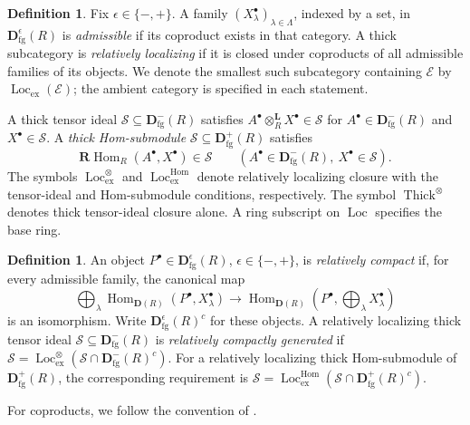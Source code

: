\documentclass[11pt]{amsart}
\numberwithin{equation}{section}
\theoremstyle{definition}
\newtheorem{definition}[theorem]{Definition}
\theoremstyle{remark}
\DeclareMathOperator{\Loc}{Loc}
\DeclareMathOperator{\Thick}{Thick}
\DeclareMathOperator{\Hom}{Hom}
\newcommand{\RHom}{\mathbf R\!\Hom}
\newcommand{\Lotimes}{\otimes_R^{\mathbf L}}
\newcommand{\D}{\mathbf D}
\newcommand{\fg}{\mathrm{fg}}
\newcommand{\Lex}{\Loc_{\mathrm{ex}}}
\newcommand{\Lten}{\Loc_{\mathrm{ex}}^{\otimes}}
\newcommand{\Lhom}{\Loc_{\mathrm{ex}}^{\Hom}}
\begin{document}
\begin{definition}\label{def:closures}
Fix $\epsilon\in\{-,+\}$. A family $(X^{\bullet}_\lambda)_{\lambda\in\Lambda}$,
indexed by a set, in
$\D^\epsilon_{\fg}(R)$ is \emph{admissible} if its coproduct exists in
that category. A thick subcategory is \emph{relatively localizing} if it
is closed under coproducts of all admissible families of its objects.
We denote the smallest such subcategory containing $\mathcal E$ by
$\Lex(\mathcal E)$; the ambient category is specified in each statement.

A thick tensor ideal $\mathcal S\subseteq\D^-_{\fg}(R)$ satisfies
$A^{\bullet}\Lotimes X^{\bullet}\in\mathcal S$ for $A^{\bullet}\in\D^-_{\fg}(R)$ and
$X^{\bullet}\in\mathcal S$. A \emph{thick Hom-submodule}
$\mathcal S\subseteq\D^+_{\fg}(R)$ satisfies
\[
 \RHom_R(A^{\bullet},X^{\bullet})\in\mathcal S
 \qquad(A^{\bullet}\in\D^-_{\fg}(R),\ X^{\bullet}\in\mathcal S).
\]
The symbols $\Lten$ and $\Lhom$ denote relatively localizing closure
with the tensor-ideal and Hom-submodule conditions, respectively.
The symbol $\Thick^\otimes$ denotes thick tensor-ideal closure alone.
A ring subscript on $\Loc$ specifies the base ring.
\end{definition}

\begin{definition}\label{def:relative-compact}
An object $P^{\bullet}\in\D^\epsilon_{\fg}(R)$, $\epsilon\in\{-,+\}$, is
\emph{relatively compact} if, for every admissible family, the canonical
map
\[
 \bigoplus_\lambda\Hom_{\D(R)}(P^{\bullet},X^{\bullet}_\lambda)
 \longrightarrow
 \Hom_{\D(R)}\!\left(P^{\bullet},\bigoplus_\lambda X^{\bullet}_\lambda\right)
\]
is an isomorphism. Write $\D^\epsilon_{\fg}(R)^c$ for these objects.
A relatively localizing thick tensor ideal
$\mathcal S\subseteq\D^-_{\fg}(R)$ is \emph{relatively compactly
generated} if
$\mathcal S=\Lten(\mathcal S\cap\D^-_{\fg}(R)^c)$.
For a relatively localizing thick Hom-submodule of $\D^+_{\fg}(R)$,
the corresponding requirement is
$\mathcal S=\Lhom(\mathcal S\cap\D^+_{\fg}(R)^c)$.
\end{definition}

For coproducts, we follow the convention of \cite[Section~2]{Zhu26a}.
\end{document}

